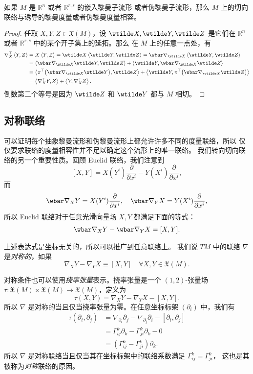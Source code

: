 \begin{proposition}
  如果 $M$ 是 $\mathbb{R}^n$ 或者 $\mathbb{R}^{r,s}$ 的嵌入黎曼子流形
  或者伪黎曼子流形，那么 $M$ 上的切向联络与诱导的黎曼度量或者伪黎曼度量相容。
\end{proposition}
\begin{proof}
  任取 $X,Y,Z\in \mathfrak X(M)$，设 $\wtilde X,\wtilde Y,\wtilde Z$
  是它们在 $\mathbb{R}^n$ 或者 $\mathbb{R}^{r,s}$ 中的某个开子集上的延拓。那么
  在 $M$ 上的任意一点处，有 
  \begin{align*}
    \nabla_X^\top\inn{Y,Z}&=X\inn{Y,Z}=\wtilde X\inn{\wtilde Y,\wtilde Z}
    =\wbar\nabla_{\wtilde X}\inn{\wtilde Y,\wtilde Z}\\
    &=\inn{\wbar\nabla_{\wtilde X}\wtilde Y,\wtilde Z}+\inn{\wtilde Y,\wbar\nabla_{\wtilde X}\wtilde Z}\\
    &=\inn{\pi^\top\bigl(\wbar\nabla_{\wtilde X}\wtilde Y\bigr),\wtilde Z}+\inn{\wtilde Y,\pi^\top\bigl(\wbar\nabla_{\wtilde X}\wtilde Z\bigr)}\\
    &=\inn{\nabla_X^\top Y,Z}+\inn{Y,\nabla_X^\top Z}.\qedhere
  \end{align*}
  倒数第二个等号是因为 $\wtilde Z$ 和 $\wtilde Y$ 都与 $M$ 相切。
\end{proof}

\subsection{对称联络}

可以证明每个抽象黎曼流形和伪黎曼流形上都允许许多不同的度量联络，所以
仅仅要求联络的度量相容性并不足以确定这个流形上的唯一联络。
我们转向切向联络的另一个重要性质。回顾 Euclid 联络，我们注意到
\[
  [X,Y]=X(Y^i)\frac{\partial}{\partial x^i}-Y(X^i)\frac{\partial}{\partial x^i},
\]
而
\[
  \wbar\nabla_XY =X(Y^i)\frac{\partial}{\partial x^i},\quad
  \wbar\nabla_YX =Y(X^i)\frac{\partial}{\partial x^i},
\]
所以 Euclid 联络对于任意光滑向量场 $X,Y$ 都满足下面的等式：
\[
  \wbar\nabla_XY-\wbar\nabla_YX= [X,Y].
\]

上述表达式是坐标无关的，所以可以推广到任意联络上。
我们说 $TM$ 中的联络 $\nabla$ 是\emph{对称的}，如果
\[
  \nabla_XY-\nabla_YX\equiv [X,Y]\quad \forall X,Y\in \mathfrak{X}(M).  
\]

对称条件也可以使用\emph{挠率张量}表示。挠率张量是一个 $(1,2)$-张量场
$\tau:\mathfrak{X}(M)\times \mathfrak{X}(M)\to \mathfrak{X}(M)$，定义为
\[
  \tau(X,Y)=\nabla_XY-\nabla_YX-[X,Y].  
\]
所以 $\nabla$ 是对称的当且仅当挠率张量为零。在任意坐标标架 $(\partial_i)$ 中，我们有
\begin{align*}
  \tau(\partial_i,\partial_j)&=\nabla_{\partial_i}\partial_j-\nabla_{\partial_j}\partial_i-[\partial_i,\partial_j]\\
  &=\Gamma_{ij}^k\partial_k-\Gamma_{ji}^k\partial_k-0\\
  &=(\Gamma_{ij}^k-\Gamma_{ji}^k)\partial_k.
\end{align*}
所以 $\nabla$ 是对称联络当且仅当其在坐标标架中的联络系数满足 $\Gamma_{ij}^k=\Gamma_{ji}^k$，
这也是其被称为\emph{对称}联络的原因。


